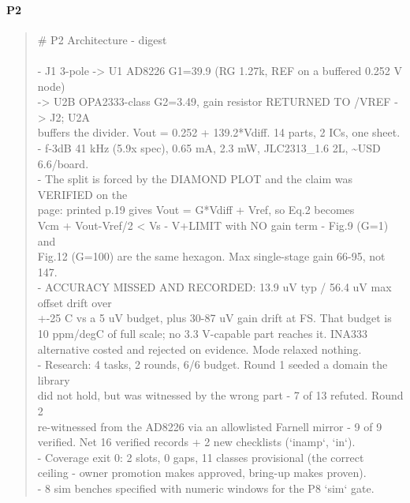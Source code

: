 \documentclass[11pt,a4paper]{article}
\begin{document}
\paragraph*{P2}
\begin{quote}\small\ttfamily\raggedright
\# P2 Architecture - digest\\
~\\
- J1 3-pole -\textgreater{} U1 AD8226 G1=39.9 (RG 1.27k, REF on a buffered 0.252 V node)\\
  -\textgreater{} U2B OPA2333-class G2=3.49, gain resistor RETURNED TO /VREF -\textgreater{} J2; U2A\\
  buffers the divider. Vout = 0.252 + 139.2{*}Vdiff. 14 parts, 2 ICs, one sheet.\\
- f-3dB 41 kHz (5.9x spec), 0.65 mA, 2.3 mW, JLC2313\_1.6 2L, \textasciitilde{}USD 6.6/board.\\
- The split is forced by the DIAMOND PLOT and the claim was VERIFIED on the\\
  page: printed p.19 gives Vout = G{*}Vdiff + Vref, so Eq.2 becomes\\
  Vcm + \textbar{}Vout-Vref\textbar{}/2 \textless{} Vs - V+LIMIT with NO gain term - Fig.9 (G=1) and\\
  Fig.12 (G=100) are the same hexagon. Max single-stage gain 66-95, not 147.\\
- ACCURACY MISSED AND RECORDED: 13.9 uV typ / 56.4 uV max offset drift over\\
  +-25 C vs a 5 uV budget, plus 30-87 uV gain drift at FS. That budget is\\
  10 ppm/degC of full scale; no 3.3 V-capable part reaches it. INA333\\
  alternative costed and rejected on evidence. Mode relaxed nothing.\\
- Research: 4 tasks, 2 rounds, 6/6 budget. Round 1 seeded a domain the library\\
  did not hold, but was witnessed by the wrong part - 7 of 13 refuted. Round 2\\
  re-witnessed from the AD8226 via an allowlisted Farnell mirror - 9 of 9\\
  verified. Net 16 verified records + 2 new checklists (`inamp`, `in`).\\
- Coverage exit 0: 2 slots, 0 gaps, 11 classes provisional (the correct\\
  ceiling - owner promotion makes approved, bring-up makes proven).\\
- 8 sim benches specified with numeric windows for the P8 `sim` gate.
\end{quote}
\end{document}
